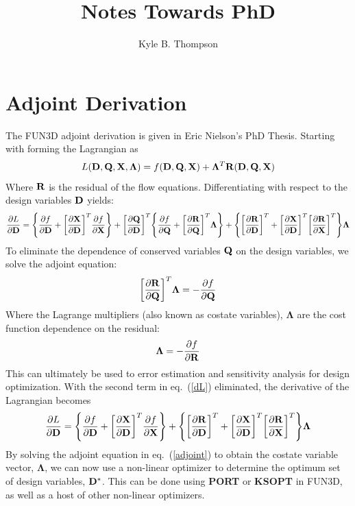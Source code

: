 \documentclass{article}   	%
\title{Notes Towards PhD}
\author{Kyle B. Thompson}
\begin{document}
\maketitle
\section{Adjoint Derivation}

The FUN3D adjoint derivation is given in Eric Nielson's PhD Thesis.  Starting with forming the Lagrangian as
%
\begin{equation}
  L({\mathbf D},{\mathbf Q},{\mathbf X},\mathbf{\Lambda})=f({\mathbf D},{\mathbf Q},{\mathbf X})
  +\mathbf{\Lambda}^T{\mathbf R}({\mathbf D},{\mathbf Q},{\mathbf X})
\end{equation}
%
Where ${\mathbf R}$ is the residual of the flow equations.  Differentiating with respect to the design variables ${\mathbf D}$ yields:
%
\begin{equation}
  \frac{\partial L}{\partial {\mathbf D}}=
  \Bigg\{\frac{\partial f}{\partial {\mathbf D}}+\bigg[\frac{\partial {\mathbf X}}{\partial {\mathbf D}}\bigg]^T \frac{\partial f}{\partial {\mathbf X}}\Bigg\}
  +\bigg[\frac{\partial {\mathbf Q}}{\partial {\mathbf D}}\bigg]^T
  \Bigg\{\frac{\partial f}{\partial {\mathbf Q}}+\bigg[\frac{\partial {\mathbf R}}{\partial {\mathbf Q}}\bigg]^T \mathbf{\Lambda}\Bigg\}
  +\Bigg\{\bigg[\frac{\partial {\mathbf R}}{\partial {\mathbf D}}\bigg]^T
  +\bigg[\frac{\partial {\mathbf X}}{\partial {\mathbf D}}\bigg]^T\bigg[\frac{\partial {\mathbf R}}{\partial {\mathbf X}}\bigg]^T\Bigg\}\mathbf{\Lambda}
  \label{dL}
\end{equation}
%
To eliminate the dependence of conserved variables ${\mathbf Q}$ on the design variables, we solve the adjoint equation:
%
\begin{equation}
  \label{adjoint}
  \bigg[\frac{\partial {\mathbf R}}{\partial {\mathbf Q}}\bigg]^T\mathbf{\Lambda}= -\frac{\partial f}{\partial {\mathbf Q}}
\end{equation}
%
Where the Lagrange multipliers (also known as costate variables), $\mathbf{\Lambda}$ are the cost function dependence on the residual:
%
\begin{equation}
  \mathbf{\Lambda}=-\frac{\partial f}{\partial {\mathbf R}}
\end{equation}
%
This can ultimately be used to error estimation and sensitivity analysis for
design optimization.  With the second term in eq.~(\ref{dL}) eliminated, the
derivative of the Lagrangian becomes
%
\begin{equation}
  \frac{\partial L}{\partial {\mathbf D}}=
  \Bigg\{\frac{\partial f}{\partial {\mathbf D}}+\bigg[\frac{\partial {\mathbf X}}{\partial {\mathbf D}}\bigg]^T \frac{\partial f}{\partial {\mathbf X}}\Bigg\}
  +\Bigg\{\bigg[\frac{\partial {\mathbf R}}{\partial {\mathbf D}}\bigg]^T
  +\bigg[\frac{\partial {\mathbf X}}{\partial {\mathbf D}}\bigg]^T\bigg[\frac{\partial {\mathbf R}}{\partial {\mathbf X}}\bigg]^T\Bigg\}\mathbf{\Lambda}
  \label{obj_function}
\end{equation}
%
By solving the adjoint equation in eq.~(\ref{adjoint}) to obtain the costate
variable vector, $\mathbf{\Lambda}$, we can now use a non-linear optimizer to
determine the optimum set of design variables, ${\mathbf D}^*$. This can be done using
{\bf PORT} or {\bf KSOPT} in FUN3D, as well as a host of other non-linear
optimizers.
\end{document}
